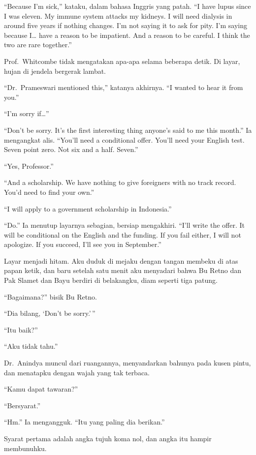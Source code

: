 \documentclass[11pt,twoside,openany]{book}
\makeatletter
\newcommand{\scenebreak}{\par\vspace{0.9em}{\centering\textsc{*\hspace{0.7em}*\hspace{0.7em}*}\par}\vspace{0.9em}\@afterindentfalse\@afterheading}
\makeatother
\begin{document}
``Because I'm sick,'' kataku, dalam bahasa Inggris yang patah. ``I have lupus since I was eleven. My immune system attacks my kidneys. I will need dialysis in around five years if nothing changes. I'm not saying it to ask for pity. I'm saying because I\ldots{} have a reason to be impatient. And a reason to be careful. I think the two are rare together.''

Prof.~Whitcombe tidak mengatakan apa-apa selama beberapa detik. Di layar, hujan di jendela bergerak lambat.

``Dr.~Prameswari mentioned this,'' katanya akhirnya. ``I wanted to hear it from you.''

``I'm sorry if\ldots{}''

``Don't be sorry. It's the first interesting thing anyone's said to me this month.'' Ia mengangkat alis. ``You'll need a conditional offer. You'll need your English test. Seven point zero. Not six and a half. Seven.''

``Yes, Professor.''

``And a scholarship. We have nothing to give foreigners with no track record. You'd need to find your own.''

``I will apply to a government scholarship in Indonesia.''

``Do.'' Ia menutup layarnya sebagian, bersiap mengakhiri. ``I'll write the offer. It will be conditional on the English and the funding. If you fail either, I will not apologize. If you succeed, I'll see you in September.''

Layar menjadi hitam. Aku duduk di mejaku dengan tangan membeku di atas papan ketik, dan baru setelah satu menit aku menyadari bahwa Bu Retno dan Pak Slamet dan Bayu berdiri di belakangku, diam seperti tiga patung.

``Bagaimana?'' bisik Bu Retno.

``Dia bilang, `Don't be sorry.'\,''

``Itu baik?''

``Aku tidak tahu.''

Dr.~Anindya muncul dari ruangannya, menyandarkan bahunya pada kusen pintu, dan menatapku dengan wajah yang tak terbaca.

``Kamu dapat tawaran?''

``Bersyarat.''

``Hm.'' Ia mengangguk. ``Itu yang paling dia berikan.''

\scenebreak
Syarat pertama adalah angka tujuh koma nol, dan angka itu hampir membunuhku.
\end{document}
